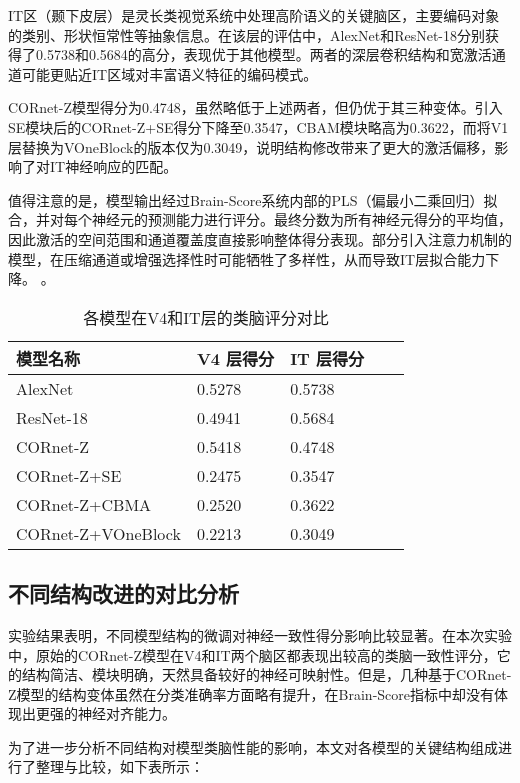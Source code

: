 IT区（颞下皮层）是灵长类视觉系统中处理高阶语义的关键脑区，主要编码对象的类别、形状恒常性等抽象信息。在该层的评估中，AlexNet和ResNet-18分别获得了0.5738和0.5684的高分，表现优于其他模型。两者的深层卷积结构和宽激活通道可能更贴近IT区域对丰富语义特征的编码模式。

CORnet-Z模型得分为0.4748，虽然略低于上述两者，但仍优于其三种变体。引入SE模块后的CORnet-Z+SE得分下降至0.3547，CBAM模块略高为0.3622，而将V1层替换为VOneBlock的版本仅为0.3049，说明结构修改带来了更大的激活偏移，影响了对IT神经响应的匹配。

值得注意的是，模型输出经过Brain-Score系统内部的PLS（偏最小二乘回归）拟合，并对每个神经元的预测能力进行评分。最终分数为所有神经元得分的平均值，因此激活的空间范围和通道覆盖度直接影响整体得分表现。部分引入注意力机制的模型，在压缩通道或增强选择性时可能牺牲了多样性，从而导致IT层拟合能力下降。
。

\begin{table}[htb]
	\centering
	\caption{各模型在V4和IT层的类脑评分对比}
	\label{tab:各模型在V4和IT层的类脑评分对比}
	\begin{tabular}{lllll}
		\hline
		模型名称& V4 层得分 & IT 层得分 \\
		\hline
		AlexNet & 0.5278 & 0.5738  \\
		ResNet-18 & 0.4941 & 0.5684  \\
		CORnet-Z & 0.5418 & 0.4748  \\
		CORnet-Z+SE  & 0.2475 & 0.3547  \\
		CORnet-Z+CBMA & 0.2520 & 0.3622  \\
		CORnet-Z+VOneBlock & 0.2213 & 0.3049  \\
		\hline
	\end{tabular}
\end{table}

\subsection{不同结构改进的对比分析}

实验结果表明，不同模型结构的微调对神经一致性得分影响比较显著。在本次实验中，原始的CORnet-Z模型在V4和IT两个脑区都表现出较高的类脑一致性评分，它的结构简洁、模块明确，天然具备较好的神经可映射性。但是，几种基于CORnet-Z模型的结构变体虽然在分类准确率方面略有提升，在Brain-Score指标中却没有体现出更强的神经对齐能力。

为了进一步分析不同结构对模型类脑性能的影响，本文对各模型的关键结构组成进行了整理与比较，如下表所示：

